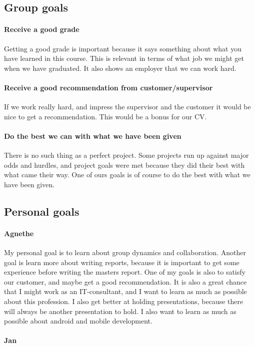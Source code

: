 \subsection{Group goals}
\paragraph{Receive a good grade}
Getting a good grade is important because it says something about what you have learned in this course. 
This is relevant in terms of what job we might get when we have graduated. It also shows an employer that we can work hard. 
\paragraph{Receive a good recommendation from customer/supervisor}
If we work really hard, and impress the supervisor and the customer it would be nice to get a recommendation. This would be a bonus for our CV.


\paragraph{Do the best we can with what we have been given}
There is no such thing as a perfect project.
Some projects run up against major odds and hurdles, and project goals were met because they did their best with what came their way. One of ours goals is of course to do the best with what we have been given.


\subsection{Personal goals}
\paragraph{Agnethe}

My personal goal is to learn about group dynamics and collaboration. Another goal is learn more about writing reports, because it is important to get some experience before writing the masters report. One of my goals is also to  satisfy our customer, and maybe get a good recommendation. It is also a great chance that I might work as an IT-consultant, and I want to learn as much as possible about this profession. I also  get better at holding presentations, because there will always be another presentation to hold. I also want to learn as much as possible about android and mobile development.

\paragraph{Jan}

